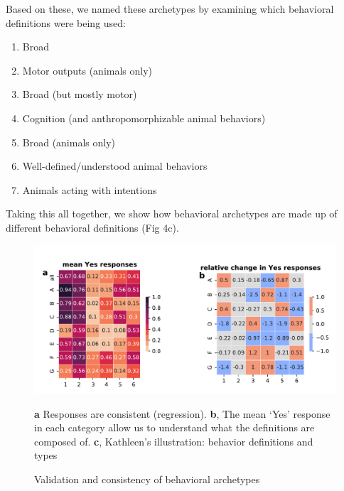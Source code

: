 \documentclass[a4paper, 11pt]{article}
\begin{document}
Based on these, we named these archetypes by examining which behavioral definitions were being used:

  \begin{enumerate}[label=\Alph*]
    \item Broad
    
    \item Motor outputs (animals only)

    \item Broad (but mostly motor)

    \item Cognition (and anthropomorphizable animal behaviors)
    
    \item Broad (animals only)
    
    \item Well-defined/understood animal behaviors

    \item Animals acting with intentions
\end{enumerate}

Taking this all together, we show how behavioral archetypes are made up of different behavioral definitions (Fig 4c).

\begin{figure}
\centerline{\includegraphics[width=\textwidth]{fig4.pdf}}
\caption{Validation and consistency of behavioral archetypes} \textbf{a} Responses are consistent (regression). \textbf{b}, The mean `Yes' response in each category allow us to understand what the definitions are composed of. \textbf{c}, Kathleen's illustration: behavior definitions and types
\end{figure}
\end{document}
